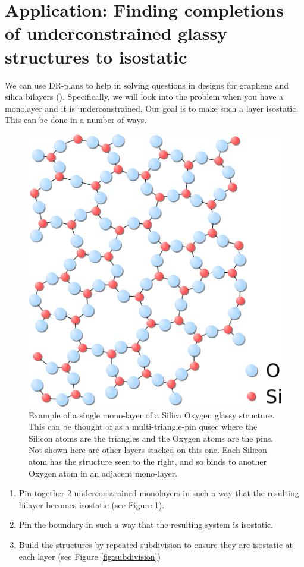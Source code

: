 \section{Application: Finding completions of underconstrained glassy structures to isostatic}
\label{sec:bodypin}

We can use DR-plans to help in solving questions in designs for graphene and silica bilayers (). Specifically, we will look into the problem when you have a monolayer and it is underconstrained. Our goal is to make such a layer isostatic. This can be done in a number of ways.

\begin{figure}\centering
    \includegraphics[width=0.4\linewidth]{img/Silica} \hspace{0.5cm}
    \caption{Example of a single mono-layer of a Silica Oxygen glassy structure. This can be thought of as a multi-triangle-pin qusec where the Silicon atoms are the triangles and the Oxygen atoms are the pins. Not shown here are other layers stacked on this one. Each Silicon atom has the structure seen to the right, and so binds to another Oxygen atom in an adjacent mono-layer.}
    \label{fig:silica_glass}
\end{figure}

\begin{enumerate}
    \item Pin together 2 underconstrained monolayers in such a way that the resulting bilayer becomes isostatic (see Figure \ref{fig:silica_glass}).
    \item Pin the boundary in such a way that the resulting system is isostatic.
    \item Build the structures by repeated subdivision to ensure they are isostatic at each layer (see Figure \ref{fig:subdivision})
\end{enumerate}


